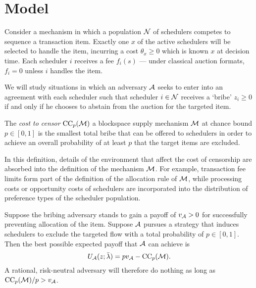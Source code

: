 \newpage

\section{Model}


Consider a mechanism in which a population $\mathcal{N}$ of schedulers competes to sequence a transaction item.
%
Exactly one $x$ of the active schedulers will be selected to handle the item, incurring a cost $\theta_x\geq 0$ which is known $x$ at decision time.
%
Each scheduler $i$ receives a fee $f_i(s)$ --- under classical auction formats, $f_i=0$ unless $i$ handles the item.

We will study situations in which an adversary $\mathcal{A}$ seeks to enter into an agreement with each scheduler such that scheduler $i\in\mathcal{N}$ receives a `bribe' $z_i\geq 0$ if and only if he chooses to abstain from the auction for the targeted item.







\begin{definition}

  The \emph{cost to censor} $\mathrm{CC}_{p}(\mathcal{M})$ a blockspace supply mechanism $\mathcal{M}$ at chance bound $p\in[0,1]$ is the smallest total bribe that can be offered to schedulers in order to achieve an overall probability of at least $p$ that the target items are excluded.

\end{definition}

In this definition, details of the environment that affect the cost of censorship are absorbed into the definition of the mechanism $\mathcal{M}$.
%
For example, transaction fee limits form part of the definition of the allocation rule of $\mathcal{M}$, while processing costs or opportunity costs of schedulers are incorporated into the distribution of preference types of the scheduler population.

Suppose the bribing adversary stands to gain a payoff of $v_{\mathcal{A}}>0$ for successfully preventing allocation of the item.
%
Suppose $\mathcal{A}$ pursues a strategy that induces schedulers to exclude the targeted flow with a total probability of $p\in[0,1]$.
%
Then the best possible expected payoff that $\mathcal{A}$ can achieve is
%
\[
  U_{\mathcal{A}}(z;\bar{\lambda}) = pv_{\mathcal{A}} - \mathrm{CC}_{p}(\mathcal{M}).
\]
%
A rational, risk-neutral adversary will therefore do nothing as long as $\mathrm{CC}_{p}(\mathcal{M})/p > v_{\mathcal{A}}$.

